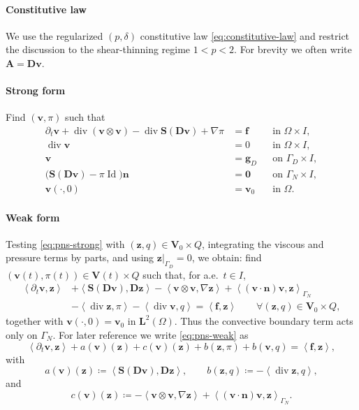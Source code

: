 \documentclass[DIV=16]{scrartcl}
\DeclareMathOperator{\divv}{div}
\DeclareMathOperator{\Id}{Id}
\newcommand{\Ip}[2]{\left\langle #1,#2\right\rangle}
\newcommand{\uu}{\boldsymbol v}
\renewcommand{\vv}{\boldsymbol z}
\newcommand{\ff}{\boldsymbol f}
\newcommand{\nn}{\boldsymbol n}
\newcommand{\GG}{\nabla}
\newcommand{\DD}{\boldsymbol D} %
\newcommand{\Sstress}{\boldsymbol S} %
\newcommand{\It}{I}
\newcommand{\dt}{\partial_t}
\newcommand{\GhD}{\Gamma_{D}}
\newcommand{\GhN}{\Gamma_N}
\newcommand{\Vv}{\boldsymbol{V}}
\newcommand{\Vvz}{\boldsymbol{V}_0}
\newcommand{\reg}{\delta}
\newcommand{\pn}{p}
\begin{document}
\paragraph{Constitutive law}
We use the regularized $(\pn,\reg)$ constitutive law \eqref{eq:constitutive-law}
and restrict the discussion to the shear-thinning regime $1<\pn < 2$.
For brevity we often write $\bm A=\DD\uu$.

\paragraph{Strong form}
Find $(\uu,\pi)$ such that
\begin{equation}
\label{eq:pns-strong}
\begin{aligned}
  \dt \uu
  +\divv(\uu\otimes\uu)
  -\divv \Sstress(\DD\uu)
  +\GG \pi &= \ff &&\text{in }\Omega\times \It,\\
  \divv \uu &= 0 &&\text{in }\Omega\times \It,\\
  \uu &= \boldsymbol g_D &&\text{on }\GhD\times \It,\\
  \bigl(\Sstress(\DD\uu)-\pi\Id\bigr)\nn &= \boldsymbol 0 &&\text{on }\GhN\times \It,\\
  \uu(\cdot,0)&=\uu_0 &&\text{in }\Omega.
\end{aligned}
\end{equation}

\paragraph{Weak form}
Testing \eqref{eq:pns-strong} with $(\vv,q)\in \Vvz\times Q$, integrating the
viscous and pressure terms by parts, and using $\vv|_{\GhD}=0$, we obtain:
find $(\uu(t),\pi(t))\in \Vv(t)\times Q$ such that, for a.e.\ $t\in \It$,
\begin{equation}
\label{eq:pns-weak}
\begin{aligned}
  \Ip{\dt\uu}{\vv}
  &+\Ip{\Sstress(\DD\uu)}{\DD\vv}
  -\Ip{\uu\otimes\uu}{\GG\vv}
  +\Ip{(\uu\cdot\nn)\uu}{\vv}_{\GhN}
\\
  &-\Ip{\divv\vv}{\pi}
  -\Ip{\divv\uu}{q}
  =\Ip{\ff}{\vv}
  \qquad \forall(\vv,q)\in \Vvz\times Q,
\end{aligned}
\end{equation}
together with $\uu(\cdot,0)=\uu_0$ in $\boldsymbol L^2(\Omega)$.
Thus the convective boundary term acts only on
$\GhN$.
For later reference we write \eqref{eq:pns-weak} as
\[
  \Ip{\dt\uu}{\vv}
  +a(\uu)(\vv)
  +c(\uu)(\vv)
  +b(\vv,\pi)+b(\uu,q)
  =\Ip{\ff}{\vv},
\]
with
\[
  a(\uu)(\vv)\coloneq \Ip{\Sstress(\DD\uu)}{\DD\vv},
  \qquad
  b(\vv,q)\coloneq -\Ip{\divv\vv}{q},
\]
and
\[
  c(\uu)(\vv)\coloneq -\Ip{\uu\otimes\uu}{\GG\vv}
  +\Ip{(\uu\cdot\nn)\uu}{\vv}_{\GhN}.
\]
\end{document}
